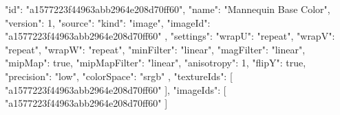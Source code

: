 {
  "id": "a1577223f44963abb2964e208d70ff60",
  "name": "Mannequin Base Color",
  "version": 1,
  "source": {
    "kind": "image",
    "imageId": "a1577223f44963abb2964e208d70ff60"
  },
  "settings": {
    "wrapU": "repeat",
    "wrapV": "repeat",
    "wrapW": "repeat",
    "minFilter": "linear",
    "magFilter": "linear",
    "mipMap": true,
    "mipMapFilter": "linear",
    "anisotropy": 1,
    "flipY": true,
    "precision": "low",
    "colorSpace": "srgb"
  },
  "textureIds": [
    "a1577223f44963abb2964e208d70ff60"
  ],
  "imageIds": [
    "a1577223f44963abb2964e208d70ff60"
  ]
}
